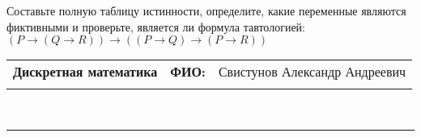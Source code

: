 \documentclass[10pt]{exam}
\newcommand{\class}{Дискретная математика}
\newcommand{\examdate}{}
\begin{document}
\begin{questions}
\begin{enumerate} [a)]
\end{enumerate}\question Составьте полную таблицу истинности, определите, какие переменные являются фиктивными и проверьте, является ли формула тавтологией:
$(P \rightarrow (Q \rightarrow R)) \rightarrow ((P \rightarrow Q) \rightarrow (P \rightarrow R))$

\end{questions}
\newpage
\begin{flushright}
\begin{tabular}{p{2.8in} r l}
\textbf{\class} & \textbf{ФИО:} &Свистунов Александр Андреевич
\\

\textbf{\examdate} &&\\
\end{tabular}\\
\end{flushright}
\rule[1ex]{\textwidth}{.1pt}
\end{document}
